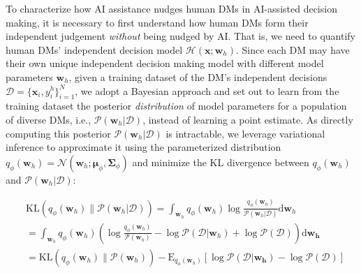 \documentclass[letterpaper]{article} %
\begin{document}
To characterize how AI assistance nudges human DMs in AI-assisted decision making,
it is necessary to first understand how human DMs form their independent judgement {\em without} being nudged by AI. That is, we need to quantify human DMs' independent decision model $\mathcal{H}(\bm{x};\bm{w}_h)$.  Since each DM may have their own unique independent decision making model with different model parameters $\bm{w}_h$, given a training dataset of the DM's independent decisions $ \mathcal{D} = \{\bm{x}_i, y_i^{h}\}_{i=1}^{N}$, we adopt a Bayesian approach and set out to learn from the training dataset the posterior {\em distribution} of model parameters for a population of diverse DMs, i.e., $\mathcal{P}(\bm{w}_h|\mathcal{D})$,  instead of learning a point estimate. As directly computing this posterior $\mathcal{P}(\bm{w}_h|\mathcal{D})$ is intractable, we leverage variational inference to approximate it using the parameterized distribution $q_{\phi}(\bm{w}_h) = \mathcal{N}(\bm{w}_h;\bm{\mu}_{\phi},\bm{\Sigma}_{\phi})$ and minimize the KL divergence between $q_{\phi}(\bm{w}_h)$ and $\mathcal{P}(\bm{w}_h|\mathcal{D})$:
\begin{small}
\begin{equation}
\begin{split}
    &\mbox{KL}(q_{\phi}(\bm{w}_h)\|\mathcal{P}(\bm{w}_h|\mathcal{D})) = \int_{\bm{w}_h} q_{\phi}(\bm{w}_h) \log \frac{ q_{\phi}(\bm{w}_h)}{\mathcal{P}(\bm{w}_h|\mathcal{D})} \mathrm{d}\bm{w}_h  \\
    & =\int_{\bm{w}_h} q_{\phi}(\bm{w}_h) ( \log\frac{ q_{\phi}(\bm{w}_h)}{ \mathcal{P}(\bm{w}_h) } - \log \mathcal{P}(\mathcal{D}|\bm{w}_h) + \log \mathcal{P}(\mathcal{D}) )\mathrm{d}\bm{\bm{w}_h} \\
    & =  \mbox{KL}(q_{\phi}(\bm{w}_h)\|\mathcal{P}(\bm{w}_h)) -  \mathrm{E}_{q_{\phi}(\bm{w}_h)}[\log \mathcal{P}(\mathcal{D}|\bm{\bm{w}_h}) -\log \mathcal{P}(\mathcal{D})]
\end{split}
\end{equation}
\end{small}
\end{document}
